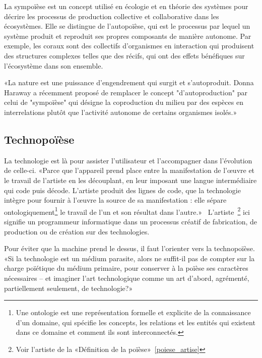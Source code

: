 La sympoïèse est un concept utilisé en écologie et en théorie des systèmes pour décrire les processus de production collective et collaborative dans les écosystèmes. Elle se distingue de l'autopoïèse, qui est le processus par lequel un système produit et reproduit ses propres composants de manière autonome. Par exemple, les coraux sont des collectifs d'organismes en interaction qui produisent des structures complexes telles que des récifs, qui ont des effets bénéfiques sur l'écosystème dans son ensemble.

«La nature est une puissance d’engendrement qui surgit et s’autoproduit. Donna Haraway a récemment proposé de remplacer le concept "d’autoproduction" par celui de "sympoïèse" qui désigne la coproduction du milieu par des espèces en interrelations plutôt que l’activité autonome de certains organismes isolés.»~\cite{guillibert:tel-02929676}

\subsection{Technopoïèse}


La technologie est là pour assister l'utilisateur et l'accompagner dans l'évolution de celle-ci. «Parce que l’appareil prend place entre la manifestation de l’œuvre et le travail de l’artiste en les découplant, en leur imposant une langue intermédiaire qui code puis décode. L’artiste produit des lignes de code, que la technologie intègre pour fournir à l’œuvre la source de sa manifestation : elle sépare ontologiquement\footnote{Une ontologie est une représentation formelle et explicite de la connaissance d'un domaine, qui spécifie les concepts, les relations et les entités qui existent dans ce domaine et comment ils sont interconnectés.} le travail de l’un et son résultat dans l’autre.»~\cite{artiste_techno_conf_2012} L'artiste~\footnote{Voir l'artiste de la «Définition de la poïèse»~\ref{poiese_artise}} ici signifie un programmeur informatique dans un processus créatif de fabrication, de production ou de création sur des technologies.

Pour éviter que la machine prend le dessus, il faut l'orienter vers la technopoïèse. «Si la technologie est un médium parasite, alors ne suffit-il pas de compter sur la charge poïétique du médium primaire, pour conserver à la poïèse ses caractères nécessaires – et imaginer l’art technologique comme un art d’abord, agrémenté, partiellement seulement, de technologie?»~\cite{artiste_techno_conf_2012} %


